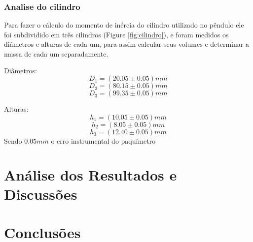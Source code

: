 \documentclass[12pt,a4paper]{article}
\begin{document}
\subsubsection{Analise do cilindro}
Para fazer o cálculo do momento de inércia do cilindro utilizado no pêndulo ele foi subdividido em três cilindros (Figure \ref{fig:cilindro}), e foram medidos os diâmetros e alturas de cada um, para assim calcular seus volumes e determinar a massa de cada um separadamente.

Diâmetros:
$$ D_1 = (20.05 \pm 0.05)mm $$
$$ D_2 = (80.15 \pm 0.05)mm $$
$$ D_3 = (99.35 \pm 0.05)mm $$

Alturas:
$$ h_1 = (10.05 \pm 0.05)mm $$
$$ h_2 = (8.05 \pm 0.05)mm $$
$$ h_3 = (12.40 \pm 0.05)mm $$
Sendo $0.05mm$ o erro instrumental do paquímetro

\section{Análise dos Resultados e Discussões}


\section{Conclusões}
\end{document}
